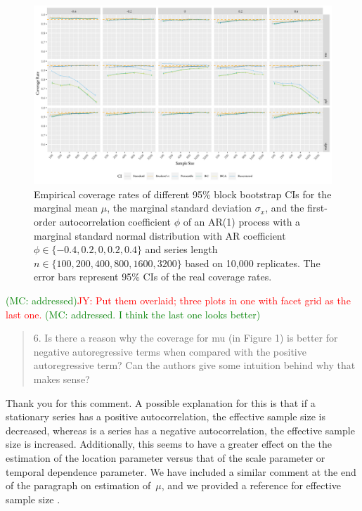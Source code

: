 \documentclass[12pt]{article}
\newcommand{\jy}[1]{\textcolor{red}{JY: #1}}
\newcommand{\mc}[1]{\textcolor{green}{(MC: #1)}}
\newenvironment{comment}%
{\begin{quotation}\noindent\small\it\color{darkblue}\ignorespaces%
}{\end{quotation}}
\begin{document}
\begin{figure}[tbp]
  \centering
  \includegraphics[width=\textwidth]{figures/alt2_plot_norm1}
  \caption{Empirical coverage rates of different 95\% block bootstrap CIs for
    the marginal mean $\mu$, the marginal standard deviation $\sigma_x$, and
    the first-order autocorrelation coefficient $\phi$ of an AR(1) process with 
    a marginal standard 
    normal distribution with AR coefficient
    $\phi \in \{-0.4, 0.2, 0, 0.2, 0.4\}$ and series length
    $n \in \{100, 200, 400, 800, 1600, 3200\}$ based on 10,000 replicates. The
    error bars represent 95\% CIs of the real coverage rates.}
  \label{fig:alt2_norm1}
\end{figure}

\mc{addressed}\jy{Put them overlaid; three plots in one with facet
  grid as the last one.}
  \mc{addressed. I think the last one looks better}

\begin{comment}
6.  Is there a reason why the coverage for mu (in Figure 1) is better for 
negative autoregressive terms when compared with the positive autoregressive 
term? Can the authors give some intuition behind why that makes sense? 
\end{comment}

Thank you for this comment.
A possible explanation for this is that if a 
stationary series has a positive 
autocorrelation, the effective sample
size is decreased, whereas is a series has a negative autocorrelation, the
effective sample size is increased. Additionally, this seems to have a 
greater effect on the the estimation of the location parameter versus that
of the scale parameter or temporal dependence parameter. We have included a 
similar
comment at the end of the paragraph on estimation of~$\mu$, and we provided a 
reference for effective sample size \citep{geyer2011introduction}.
\end{document}

